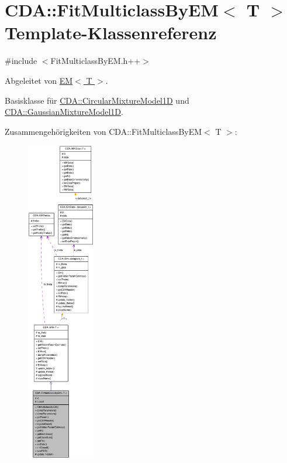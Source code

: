 \hypertarget{classCDA_1_1FitMulticlassByEM}{
\section{CDA::FitMulticlassByEM$<$ T $>$ Template-\/Klassenreferenz}
\label{classCDA_1_1FitMulticlassByEM}
}


{\ttfamily \#include $<$FitMulticlassByEM.h++$>$}



Abgeleitet von \hyperlink{classCDA_1_1EM}{EM$<$ T $>$}.



Basisklasse für \hyperlink{classCDA_1_1CircularMixtureModel1D}{CDA::CircularMixtureModel1D} und \hyperlink{classCDA_1_1GaussianMixtureModel1D}{CDA::GaussianMixtureModel1D}.



Zusammengehörigkeiten von CDA::FitMulticlassByEM$<$ T $>$:\nopagebreak
\begin{figure}[H]
\begin{center}
\leavevmode
\includegraphics[height=400pt]{classCDA_1_1FitMulticlassByEM__coll__graph}
\end{center}
\end{figure}
